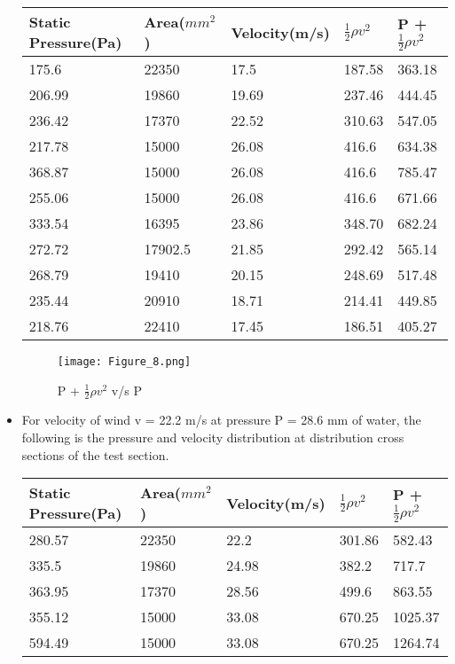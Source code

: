 \documentclass[12pt,a4paper]{article}
\begin{document}
\begin{itemize}
\begin{table}
\begin{center}
\begin{tabular}{|p{5cm}|p{3cm}|p{2.5cm}|p{2.5cm}|p{2.5cm}|}
\hline
Static Pressure(Pa) & Area($mm^2$) & Velocity(m/s) & $\frac{1}{2} \rho v^2$ & P + $\frac{1}{2} \rho v^2$ \\ 
\hline
175.6&22350&17.5&187.58&363.18\\
206.99&19860&19.69&237.46&444.45\\
236.42&17370&22.52&310.63&547.05\\
217.78&15000&26.08&416.6&634.38\\
368.87&15000&26.08&416.6&785.47\\
255.06&15000&26.08&416.6&671.66\\
333.54&16395&23.86&348.70&682.24\\
272.72&17902.5&21.85&292.42&565.14\\
268.79&19410&20.15&248.69&517.48\\
235.44&20910&18.71&214.41&449.85\\
218.76&22410&17.45&186.51&405.27\\
\hline
\end{tabular}
\end{center}
\end{table}
\begin{figure}[!ht]
	\begin{center}
			\texttt{[image: Figure\_8.png]}
	\end{center}
	\caption{P + $\frac{1}{2} \rho v^2$ v/s P}
\end{figure}
\item For velocity of wind v = 22.2 m/s at pressure P = 28.6 mm of water, the following is the pressure and velocity distribution at distribution cross sections of the test section.
\clearpage
\begin{table}
\begin{center}
\begin{tabular}{|p{5cm}|p{3cm}|p{2.5cm}|p{2.5cm}|p{2.5cm}|}
\hline
Static Pressure(Pa) & Area($mm^2$) & Velocity(m/s) & $\text{$\frac{1}{2} \rho v^2$}$ & P + $\text{$\frac{1}{2} \rho v^2$}$ \\ 
\hline
280.57 &22350 &22.2 &301.86 &582.43\\
335.5 &19860 &24.98 &382.2 &717.7\\
363.95 &17370 &28.56 &499.6 &863.55\\
355.12 &15000 &33.08 &670.25 &1025.37\\
594.49 &15000 &33.08 &670.25 &1264.74\\

\end{tabular}
\end{center}
\end{table}
\end{itemize}
\end{document}
